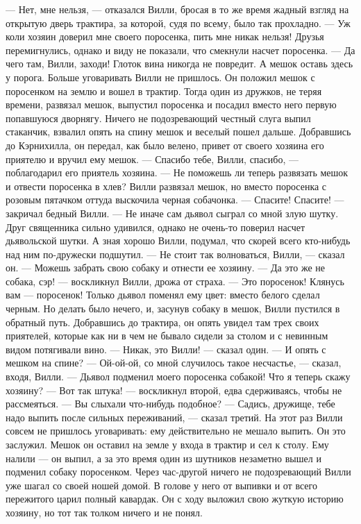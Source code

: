 — Нет, мне нельзя, — отказался Вилли, бросая в то же время жадный взгляд на открытую дверь трактира, за которой, судя по всему, было так прохладно. — Уж коли хозяин доверил мне своего поросенка, пить мне никак нельзя!
Друзья перемигнулись, однако и виду не показали, что смекнули насчет поросенка.
— Да чего там, Вилли, заходи! Глоток вина никогда не повредит. А мешок оставь здесь у порога.
Больше уговаривать Вилли не пришлось. Он положил мешок с поросенком на землю и вошел в трактир. Тогда один из дружков, не теряя времени, развязал мешок, выпустил поросенка и посадил вместо него первую попавшуюся дворнягу.
Ничего не подозревающий честный слуга выпил стаканчик, взвалил опять на спину мешок и веселый пошел дальше. Добравшись до Кэрнихилла, он передал, как было велено, привет от своего хозяина его приятелю и вручил ему мешок.
— Спасибо тебе, Вилли, спасибо, — поблагодарил его приятель хозяина. — Не поможешь ли теперь развязать мешок и отвести поросенка в хлев?
Вилли развязал мешок, но вместо поросенка с розовым пятачком оттуда выскочила черная собачонка.
— Спасите! Спасите! — закричал бедный Вилли. — Не иначе сам дьявол сыграл со мной злую шутку.
Друг священника сильно удивился, однако не очень-то поверил насчет дьявольской шутки. А зная хорошо Вилли, подумал, что скорей всего кто-нибудь над ним по-дружески подшутил.
— Не стоит так волноваться, Вилли, — сказал он. — Можешь забрать свою собаку и отнести ее хозяину.
— Да это же не собака, сэр! — воскликнул Вилли, дрожа от страха. — Это поросенок! Клянусь вам — поросенок! Только дьявол поменял ему цвет: вместо белого сделал черным.
Но делать было нечего, и, засунув собаку в мешок, Вилли пустился в обратный путь. Добравшись до трактира, он опять увидел там трех своих приятелей, которые как ни в чем не бывало сидели за столом и с невинным видом потягивали вино.
— Никак, это Вилли! — сказал один. — И опять с мешком на спине?
— Ой-ой-ой, со мной случилось такое несчастье, — сказал, входя, Вилли. — Дьявол подменил моего поросенка собакой! Что я теперь скажу хозяину?
— Вот так штука! — воскликнул второй, едва сдерживаясь, чтобы не рассмеяться. — Вы слыхали что-нибудь подобное?
— Садись, дружище, тебе надо выпить после сильных переживаний, — сказал третий.
На этот раз Вилли совсем не пришлось уговаривать: ему действительно не мешало выпить. Он это заслужил.
Мешок он оставил на земле у входа в трактир и сел к столу. Ему налили — он выпил, а за это время один из шутников незаметно вышел и подменил собаку поросенком.
Через час-другой ничего не подозревающий Вилли уже шагал со своей ношей домой. В голове у него от выпивки и от всего пережитого царил полный кавардак. Он с ходу выложил свою жуткую историю хозяину, но тот так толком ничего и не понял.
